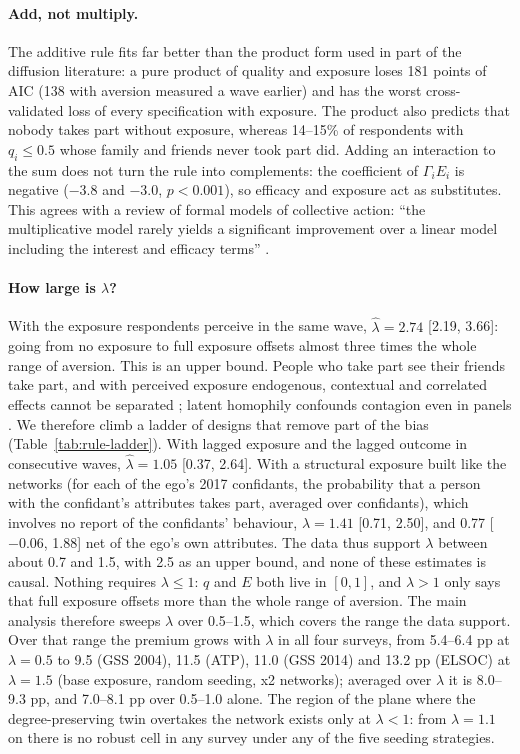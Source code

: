 \paragraph{Add, not multiply.} The additive rule fits far better than the product form used in
part of the diffusion literature: a pure product of quality and exposure loses 181 points of AIC
(138 with aversion measured a wave earlier) and has the worst cross-validated loss of every
specification with exposure. The product also predicts that nobody takes part without exposure,
whereas 14--15\% of respondents with $q_i \le 0.5$ whose family and friends never took part did.
Adding an interaction to the sum does not turn the rule into complements: the coefficient of
$\Gamma_i E_i$ is negative ($-3.8$ and $-3.0$, $p < 0.001$), so efficacy and exposure act as
substitutes. This agrees with a review of formal models of collective action: ``the multiplicative model rarely yields a significant improvement over a
linear model including the interest and efficacy terms'' \citep[p.~279]{oliver1993}.

\paragraph{How large is $\lambda$?} With the exposure respondents perceive in the same wave,
$\hat\lambda = 2.74$ [2.19, 3.66]: going from no exposure to full exposure offsets almost three
times the whole range of aversion. This is an upper bound. People who take part see their
friends take part, and with perceived exposure endogenous, contextual and correlated effects
cannot be separated \citep{manski1993}; latent homophily confounds contagion even in panels
\citep{shalizi2011}. We therefore climb a ladder of designs that remove part of the bias
(Table~\ref{tab:rule-ladder}). With lagged exposure and the lagged outcome in consecutive waves,
$\hat\lambda = 1.05$ [0.37, 2.64]. With a structural exposure built like the networks (for each
of the ego's 2017 confidants, the probability that a person with the confidant's attributes takes
part, averaged over confidants), which involves no report of the confidants' behaviour,
$\hat\lambda = 1.41$ [0.71, 2.50], and 0.77 [$-0.06$, 1.88] net of the ego's own attributes.
The data thus support $\lambda$ between about 0.7 and 1.5, with 2.5 as an upper bound, and
none of these estimates is causal. Nothing requires $\lambda \le 1$: $q$ and $E$ both live in
$[0, 1]$, and $\lambda > 1$ only says that full exposure offsets more than the whole range of
aversion. The main analysis therefore sweeps $\lambda$ over 0.5--1.5, which covers the range the
data support. Over that range the premium grows with $\lambda$ in all four surveys, from 5.4--6.4
pp at $\lambda = 0.5$ to 9.5 (GSS 2004), 11.5 (ATP), 11.0 (GSS 2014) and 13.2 pp (ELSOC) at
$\lambda = 1.5$ (base exposure, random seeding, x2 networks); averaged over $\lambda$ it is 8.0--9.3
pp, and 7.0--8.1 pp over 0.5--1.0 alone. The region of the plane where the degree-preserving twin
overtakes the network exists only at $\lambda < 1$: from $\lambda = 1.1$ on there is no robust cell
in any survey under any of the five seeding strategies.

